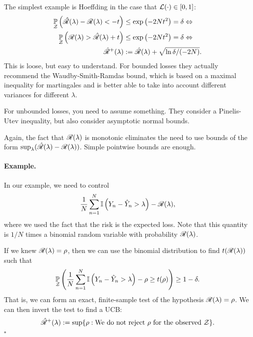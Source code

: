 \documentclass[twoside,11pt]{article}
\numberwithin{equation}{section}
\begin{document}
The simplest example is Hoeffding in the case that $\mathcal{L}(\cdot) \in [0,1]$:
%
\begin{align*}
%
\p{\calset}{\riskhat(\lambda) - \risk(\lambda) < -t} &\le
\exp\left(-2\n t^2 \right) = \delta \Leftrightarrow \\
\p{\calset}{\risk(\lambda) > \riskhat(\lambda) + t} &\le
\exp\left(-2\n t^2 \right) = \delta \Leftrightarrow \\
\rupper(\lambda) &:= \riskhat(\lambda) + \sqrt{\ln \delta / (-2 \n)}.
%
\end{align*}
%
This is loose, but easy to understand.  For bounded losses they actually
recommend the Waudby-Smith-Ramdas bound, which is based on a maximal inequality
for martingales and is better able to take into account different
variances for different $\lambda$.

For unbounded losses, you need to assume something.  They consider
a Pinelis-Utev inequality, but also consider asymptotic normal bounds.

Again, the fact that $\mathscr{R}(\lambda)$ is monotonic eliminates the need
to use bounds of the form $\sup_{\lambda} (\hat{\mathscr{R}}(\lambda) - \mathscr{R}(\lambda))$.
Simple pointwise bounds are enough.


\paragraph{Example. } In our example, we need to control
%
\begin{align*}
%
\meann \ind{\y_n - \yhat_n > \lambda} - \risk(\lambda),
%
\end{align*}
%
where we used the fact that the risk is the expected loss.  Note
that this quantity is $1/N$ times a binomial random variable
with probability $\mathscr{R}(\lambda)$.  

If we knew $\mathscr{R}(\lambda) = \rho$, then we can use the binomial
distribution to find $t(\mathscr{R}(\lambda))$ such that 
%
\begin{align*}
%
\p{\calset}{\meann \ind{\y_n - \yhat_n > \lambda} - \rho
    \ge t(\rho)} \ge 1 - \delta.
%
\end{align*}
%
That is, we can form an exact, finite-sample test of the hypothesis
$\mathscr{R}(\lambda) = \rho$.  We can then invert the test to find
a UCB:
%
\begin{align*}
%
\rupper(\lambda) := \sup \{\rho: 
    \textrm{We do not reject }\rho\textrm{ for the observed } \calset\}.
%
\end{align*}
%
$\square$
\end{document}
